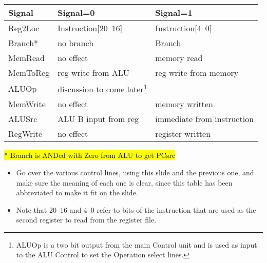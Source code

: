 \newpage
\begin{frame}[fragile]
	\begin{center}
	\begin{tabular}{|l|l|l|}\hline
	Signal & Signal=0 & Signal=1 \\ \hline
	Reg2Loc & Instruction[20--16] & Instruction[4--0] \\
 \hline
	Branch* & no branch & Branch \\
\hline
 MemRead & no effect & memory read \\
\hline	
 MemToReg & reg write from ALU & reg write from memory \\ 
\hline	
ALUOp & discussion to come later\footnote{ALUOp is a two bit output from the main Control unit and is used as input to the ALU Control to set the Operation select lines.}& \\
\hline
 MemWrite & no effect & memory written \\
\hline	
 ALUSrc & ALU B input from reg & immediate from instruction \\
\hline	
 RegWrite & no effect & register written \\ \hline
	\end{tabular}
	\end{center}
\hl{* Branch is ANDed with Zero from ALU to get PCsrc}
 
\BNotes\ifnum{}
\begin{itemize}
\item Go over the various control lines, using this slide and the previous
one, and make sure the meaning of each
one is clear, since this table has been abbreviated to make it fit on
the slide.
\item Note that 20--16 and 4--0 refer to bits of the instruction that are
  used as the second register to read from the register file.
\end{itemize}
\fi\ENotes
\end{frame}



